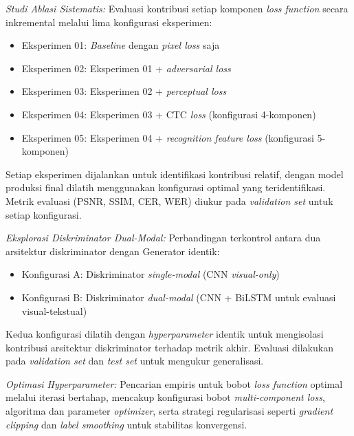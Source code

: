 \documentclass[12pt,a4paper]{article}
\begin{document}
\textit{Studi Ablasi Sistematis:} Evaluasi kontribusi setiap komponen \textit{loss function} secara inkremental melalui lima konfigurasi eksperimen:
\begin{itemize}[leftmargin=1.5cm, nosep]
\item Eksperimen 01: \textit{Baseline} dengan \textit{pixel loss} saja
\item Eksperimen 02: Eksperimen 01 + \textit{adversarial loss}
\item Eksperimen 03: Eksperimen 02 + \textit{perceptual loss}
\item Eksperimen 04: Eksperimen 03 + CTC \textit{loss} (konfigurasi 4-komponen)
\item Eksperimen 05: Eksperimen 04 + \textit{recognition feature loss} (konfigurasi 5-komponen)
\end{itemize}

Setiap eksperimen dijalankan untuk identifikasi kontribusi relatif, dengan model produksi final dilatih menggunakan konfigurasi optimal yang teridentifikasi. Metrik evaluasi (PSNR, SSIM, CER, WER) diukur pada \textit{validation set} untuk setiap konfigurasi.

\textit{Eksplorasi Diskriminator \textit{Dual-Modal}:} Perbandingan terkontrol antara dua arsitektur diskriminator dengan Generator identik:
\begin{itemize}[leftmargin=1.5cm, nosep]
\item Konfigurasi A: Diskriminator \textit{single-modal} (CNN \textit{visual-only})
\item Konfigurasi B: Diskriminator \textit{dual-modal} (CNN + BiLSTM untuk evaluasi visual-tekstual)
\end{itemize}

Kedua konfigurasi dilatih dengan \textit{hyperparameter} identik untuk mengisolasi kontribusi arsitektur diskriminator terhadap metrik akhir. Evaluasi dilakukan pada \textit{validation set} dan \textit{test set} untuk mengukur generalisasi.

\textit{Optimasi \textit{Hyperparameter}:} Pencarian empiris untuk bobot \textit{loss function} optimal melalui iterasi bertahap, mencakup konfigurasi bobot \textit{multi-component loss}, algoritma dan parameter \textit{optimizer}, serta strategi regularisasi seperti \textit{gradient clipping} dan \textit{label smoothing} untuk stabilitas konvergensi.

\end{document}
